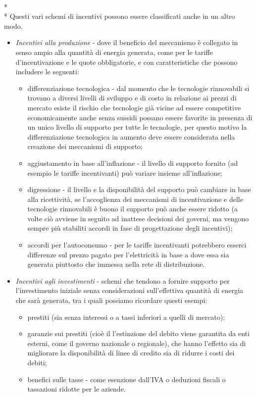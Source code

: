 \documentclass[12pt,a4paper,openright,twoside]{report}
\begin{document}
\\*\\*
Questi vari schemi di incentivi possono essere classificati anche in un altro modo.
\begin{itemize}
\item \emph{Incentivi alla produzione} - dove il beneficio del meccanismo è collegato in senso ampio alla quantità di energia generata, come per le tariffe d'incentivazione e le quote obbligatorie, e con caratteristiche che possono includere le seguenti:
\begin{itemize}
\renewcommand{\labelitemii}{$\circ$}
\item differenziazione tecnologica - dal momento che le tecnologie rinnovabili si trovano a diversi livelli di sviluppo e di costo in relazione ai prezzi di mercato esiste il rischio che tecnologie già vicine ad essere competitive economicamente anche senza sussidi possano essere favorite in presenza di un unico livello di supporto per tutte le tecnologie, per questo motivo la differenziazione tecnologica in aumento deve essere considerata nella creazione dei meccanismi di supporto;
\item aggiustamento in base all'inflazione - il livello di supporto fornito (ad esempio le tariffe incentivanti) può variare insieme all'inflazione;
\item digressione - il livello e la disponibilità del supporto può cambiare in base alla ricettività, se l'accoglienza dei meccanismi di incentivazione e delle tecnologie rinnovabili è buono il supporto può anche essere ridotto (a volte ciò avviene in seguito ad inattese decisioni dei governi, ma vengono sempre più stabiliti accordi in fase di progettazione degli incentivi);
\item accordi per l'autoconsumo - per le tariffe incentivanti potrebbero esserci differenze sul prezzo pagato per l'elettricità in base a dove essa sia generata piuttosto che immessa nella rete di distribuzione.
\end{itemize}
\item \emph{Incentivi agli investimenti} - schemi che tendono a fornire supporto per l'investimento iniziale senza considerazioni sull'effettiva quantità di energia che sarà generata, tra i quali possiamo ricordare questi esempi:
\begin{itemize}
\renewcommand{\labelitemii}{$\circ$}
\item prestiti (sia senza interessi o a tassi inferiori a quelli di mercato);
\item garanzie sui prestiti (cioè il l'estinzione del debito viene garantita da enti esterni, come il governo nazionale o regionale), che hanno l'effetto sia di migliorare la disponibilità di linee di credito sia di ridurre i costi dei debiti;
\item benefici sulle tasse - come esenzione dall'IVA o deduzioni fiscali o tassazioni ridotte per le aziende.
\end{itemize}
\end{itemize}
\end{document}
